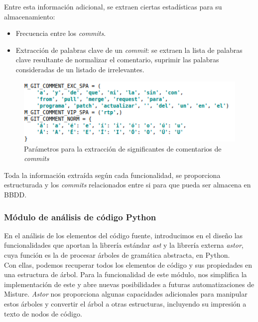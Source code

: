 Entre esta información adicional, se extraen ciertas estadísticas para su almacenamiento:\\

\begin{itemize}
\item Frecuencia entre los \textit{commits}.

\item Extracción de palabras clave de un \textit{commit}: se extraen la lista de palabras clave resultante de normalizar el comentario, suprimir las palabras consideradas de un listado de irrelevantes.
\end{itemize}

\begin{figure}[H]
   \centering
   \includegraphics[width=16cm]{img/Selection_028_git_comentarios}
   \caption{Parámetros para la extracción de significantes de comentarios de \textit{commits}}
   \label{figura:git_commnet}
\end{figure}

Toda la información extraída según cada funcionalidad, se proporciona estructurada y los \textit{commits} relacionados entre si para que pueda ser almacena en BBDD.\\


\subsubsection{Módulo de análisis de código Python} 
\label{subsec:mod_anal_python}

En el análisis de los elementos del código fuente, introducimos en el diseño las funcionalidades que aportan la librería estándar \textit{ast} y la librería externa \textit{astor}, cuya función es la de procesar árboles de gramática abstracta, en Python.\\


Con ellas, podemos recuperar todos los elementos de código y sus propiedades en una estructura de árbol. Para la funcionalidad de este módulo, nos simplifica la implementación de este y abre nuevas posibilidades a futuras automatizaciones de Misture. \textit{Astor} nos proporciona algunas capacidades adicionales para manipular estos árboles y convertir el árbol a otras estructuras, incluyendo su impresión a texto de nodos de código.\\


